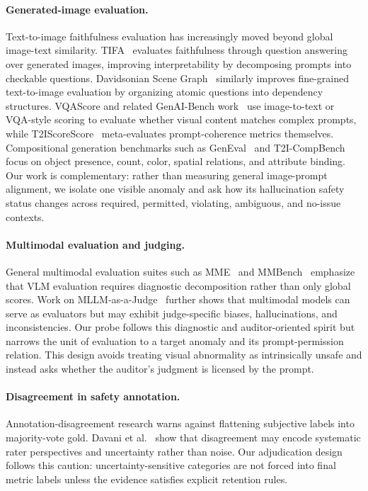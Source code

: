 \documentclass[runningheads]{llncs}
\begin{document}
\paragraph{Generated-image evaluation.}
Text-to-image faithfulness evaluation has increasingly moved beyond global image-text similarity. TIFA~\cite{hu2023tifa} evaluates faithfulness through question answering over generated images, improving interpretability by decomposing prompts into checkable questions. Davidsonian Scene Graph~\cite{cho2023dsg} similarly improves fine-grained text-to-image evaluation by organizing atomic questions into dependency structures. VQAScore and related GenAI-Bench work~\cite{lin2024vqascore,li2024genaibench} use image-to-text or VQA-style scoring to evaluate whether visual content matches complex prompts, while T2IScoreScore~\cite{saxon2024t2iscorescore} meta-evaluates prompt-coherence metrics themselves. Compositional generation benchmarks such as GenEval~\cite{ghosh2023geneval} and T2I-CompBench~\cite{huang2023t2icompbench} focus on object presence, count, color, spatial relations, and attribute binding. Our work is complementary: rather than measuring general image-prompt alignment, we isolate one visible anomaly and ask how its hallucination safety status changes across required, permitted, violating, ambiguous, and no-issue contexts.

\paragraph{Multimodal evaluation and judging.}
General multimodal evaluation suites such as MME~\cite{fu2023mme} and MMBench~\cite{liu2023mmbench} emphasize that VLM evaluation requires diagnostic decomposition rather than only global scores. Work on MLLM-as-a-Judge~\cite{chen2024mllmjudge} further shows that multimodal models can serve as evaluators but may exhibit judge-specific biases, hallucinations, and inconsistencies. Our probe follows this diagnostic and auditor-oriented spirit but narrows the unit of evaluation to a target anomaly and its prompt-permission relation. This design avoids treating visual abnormality as intrinsically unsafe and instead asks whether the auditor's judgment is licensed by the prompt.

\paragraph{Disagreement in safety annotation.}
Annotation-disagreement research warns against flattening subjective labels into majority-vote gold. Davani et al.~\cite{davani2022dealing} show that disagreement may encode systematic rater perspectives and uncertainty rather than noise. Our adjudication design follows this caution: uncertainty-sensitive categories are not forced into final metric labels unless the evidence satisfies explicit retention rules.
\end{document}
